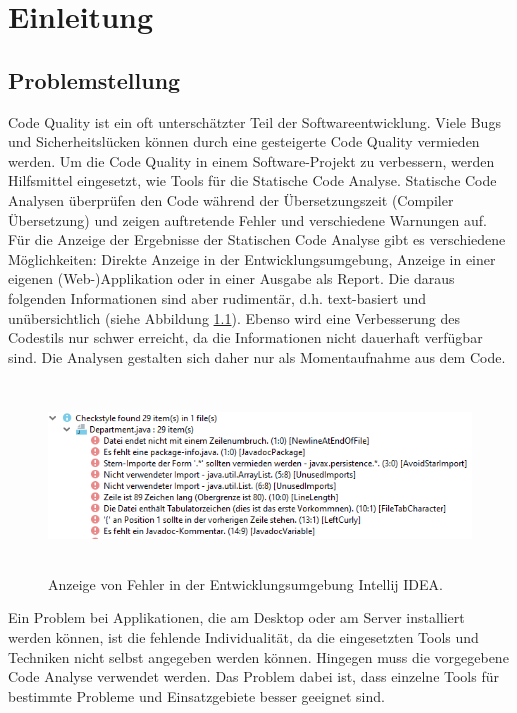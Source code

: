 \chapter{Einleitung}

\section{Problemstellung}
Code Quality ist ein oft unterschätzter Teil der Softwareentwicklung. Viele Bugs und Sicherheitslücken können durch eine gesteigerte Code Quality vermieden werden. Um die Code Quality in einem Software-Projekt zu verbessern, werden Hilfsmittel eingesetzt, wie Tools für die Statische Code Analyse. Statische Code Analysen überprüfen den Code während der Übersetzungszeit (Compiler Übersetzung) und zeigen auftretende Fehler und verschiedene Warnungen auf. Für die Anzeige der Ergebnisse der Statischen Code Analyse gibt es verschiedene Möglichkeiten: Direkte Anzeige in der Entwicklungsumgebung, Anzeige in einer eigenen (Web-)Applikation oder in einer Ausgabe als Report. Die daraus folgenden Informationen sind aber rudimentär, d.h. text-basiert und unübersichtlich (siehe Abbildung \ref{fig:findingsInIDE}). Ebenso wird eine Verbesserung des Codestils nur schwer erreicht, da die Informationen nicht dauerhaft verfügbar sind. Die Analysen gestalten sich daher nur als Momentaufnahme aus dem Code. 

\begin{figure}[tp]
  \centering
  \includegraphics[height=5cm]{images/ideChecks.PNG}
 \caption[Anzeige von Fehler in der Entwicklungsumgebung Intellij IDEA]{Anzeige von Fehler in der Entwicklungsumgebung Intellij IDEA.}
  \label{fig:findingsInIDE}
\end{figure}

Ein Problem bei Applikationen, die am Desktop oder am Server installiert werden können, ist die fehlende Individualität, da die eingesetzten Tools  und Techniken nicht selbst angegeben werden können. Hingegen muss die vorgegebene Code Analyse verwendet werden. Das Problem dabei ist, dass einzelne Tools für bestimmte Probleme und Einsatzgebiete besser geeignet sind.

